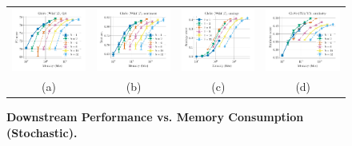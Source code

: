 \begin{figure}
	\centering
	\begin{tabular}{@{\hskip -0.0in}c@{\hskip -0.0in}c@{\hskip -0.0in}c@{\hskip -0.0in}c@{\hskip -0.0in}}
		\includegraphics[width=.245\linewidth]{figures/glove-wiki400k-am_qa_best-f1_vs_compression_linx_stoc_uni-quant-only.pdf} &
		\includegraphics[width=.245\linewidth]{figures/glove-wiki400k-am_sentiment_sst_test-acc_vs_compression_linx_stoc_uni-quant-only.pdf} &
		\includegraphics[width=.245\linewidth]{figures/glove-wiki400k-am_intrinsics_analogy-avg-score_vs_compression_linx_stoc_uni-quant-only.pdf} &
		\includegraphics[width=.245\linewidth]{figures/glove-wiki400k-am_intrinsics_similarity-avg-score_vs_compression_linx_stoc_uni-quant-only.pdf} \\
		\;\;\;\;\;(a) & \;\;\;\;\;\;(b) & \;\;\;\;\;\;(c) & \;\;\;\;\;\;(d)
	\end{tabular}
	\caption{
		\textbf{Downstream Performance vs. Memory Consumption (Stochastic).}	}
	\label{fig:perf_comp_wiki17only_stoc}
\end{figure}


